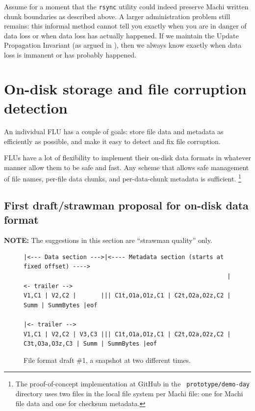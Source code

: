 \documentclass[preprint,10pt]{sigplanconf}
\begin{document}
Assume for a moment that the {\tt rsync} utility could indeed preserve
Machi written chunk boundaries as described above.  A larger
administration problem still remains: this informal method cannot tell
you exactly when you are in danger of data loss or when data loss has
actually happened.  If we maintain the Update Propagation Invariant
(as argued in \cite{machi-chain-manager-design}),
then we always know exactly when data loss is immanent or has
probably happened.

\section{On-disk storage and file corruption detection}
\label{sec:on-disk}

An individual FLU has a couple of goals: store file data and metadata
as efficiently as possible, and make it easy to detect and fix file
corruption.

FLUs have a lot of flexibility to implement their on-disk data formats in
whatever manner allow them to be safe and fast.  Any scheme that
allows safe management of file names, per-file data chunks, and
per-data-chunk metadata is sufficient.
\footnote{The proof-of-concept implementation at GitHub in the {\tt
    prototype/demo-day} directory uses two files in the local file
  system per Machi file: one for Machi file data and one for
  checksum metadata.}

\subsection{First draft/strawman proposal for on-disk data format}
\label{sub:on-disk-data-format}

{\bf NOTE:} The suggestions in this section are ``strawman quality''
only.

\begin{figure}
\begin{verbatim}
|<--- Data section --->|<---- Metadata section (starts at fixed offset) ---->
                                                          |<- trailer -->
V1,C1 | V2,C2 |       ||| C1t,O1a,O1z,C1 | C2t,O2a,O2z,C2 | Summ | SummBytes |eof
                                                                           |<- trailer -->
V1,C1 | V2,C2 | V3,C3 ||| C1t,O1a,O1z,C1 | C2t,O2a,O2z,C2 | C3t,O3a,O3z,C3 | Summ | SummBytes |eof
\end{verbatim}
\caption{File format draft \#1, a snapshot at two different times.}
\label{fig:file-format-d1}
\end{figure}
\end{document}

